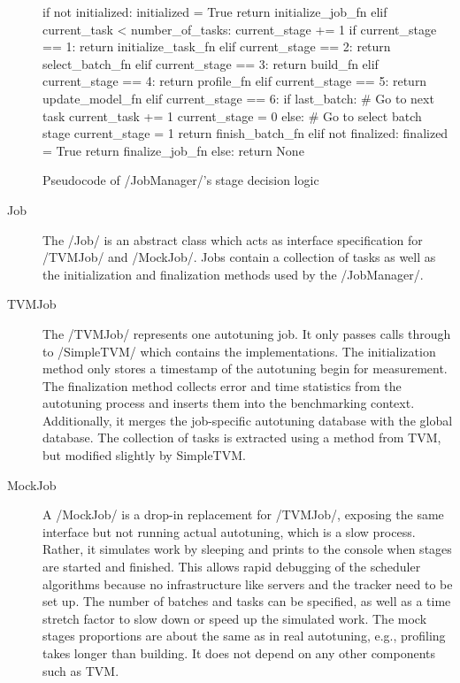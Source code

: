 \begin{description}
\begin{listing}[h]
\begin{pythoncode}
if not initialized:
    initialized = True
    return initialize_job_fn
elif current_task < number_of_tasks:
    current_stage += 1
    if   current_stage == 1: return initialize_task_fn
    elif current_stage == 2: return select_batch_fn
    elif current_stage == 3: return build_fn
    elif current_stage == 4: return profile_fn
    elif current_stage == 5: return update_model_fn
    elif current_stage == 6:
        if last_batch:
            # Go to next task
            current_task += 1
            current_stage = 0
        else:
            # Go to select batch stage
            current_stage = 1
        return finish_batch_fn
elif not finalized:
    finalized = True
    return finalize_job_fn
else: return None
\end{pythoncode}
\unskip
\caption[{Pseudocode of JobManager's stage decision logic}]{Pseudocode of \pythoninline/JobManager/'s stage decision logic}
\label{lst:stage-decision-algo}
\end{listing}
	\item[Job] The \pythoninline/Job/ is an abstract class which acts as interface specification for \pythoninline/TVMJob/ and \pythoninline/MockJob/. Jobs contain a collection of tasks as well as the initialization and finalization methods used by the \pythoninline/JobManager/.
	\item[TVMJob] The \pythoninline/TVMJob/ represents one autotuning job. It only passes calls through to \pythoninline/SimpleTVM/ which contains the implementations. The initialization method only stores a timestamp of the autotuning begin for measurement. The finalization method collects error and time statistics from the autotuning process and inserts them into the benchmarking context. Additionally, it merges the job-specific autotuning database with the global database. The collection of tasks is extracted using a method from TVM, but modified slightly by SimpleTVM.
	\item[MockJob] A \pythoninline/MockJob/ is a drop-in replacement for \pythoninline/TVMJob/, exposing the same interface but not running actual autotuning, which is a slow process. Rather, it simulates work by sleeping and prints to the console when stages are started and finished. This allows rapid debugging of the scheduler algorithms because no infrastructure like servers and the tracker need to be set up. The number of batches and tasks can be specified, as well as a time stretch factor to slow down or speed up the simulated work. The mock stages proportions are about the same as in real autotuning, e.g., profiling takes longer than building. It does not depend on any other components such as TVM.
\end{description}

